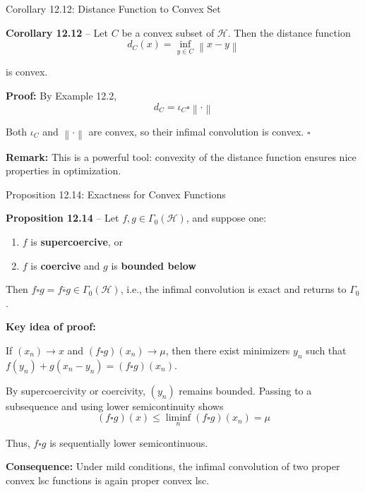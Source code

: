 \documentclass[aspectratio=169,10pt]{beamer}
\newcommand{\cH}{\mathcal{H}}
\newcommand{\norm}[1]{\left\|#1\right\|}
\newcommand{\co}{\square}
\begin{document}
\begin{frame}{Corollary 12.12: Distance Function to Convex Set}

  \textbf{Corollary 12.12} -- Let $C$ be a convex subset of $\cH$. Then
  the distance function
  \[
    d_C(x) = \inf_{y \in C} \norm{x - y}
  \]

  is convex.

  \vspace{1cm}

  \textbf{Proof:} By Example 12.2,
  \[
    d_C = \iota_C \co \norm{\cdot}
  \]

  Both $\iota_C$ and $\norm{\cdot}$ are convex, so their infimal
  convolution is convex. $\square$

  \vspace{1cm}

  \textbf{Remark:} This is a powerful tool: convexity of the distance
  function ensures nice properties in optimization.

\end{frame}

\begin{frame}[allowframebreaks]{Proposition 12.14: Exactness for Convex Functions}

  \textbf{Proposition 12.14} -- Let $f, g \in \Gamma_0(\cH)$, and suppose one:

  \begin{enumerate}
    \item[(i)] $f$ is \textbf{supercoercive}, or
    \item[(ii)] $f$ is \textbf{coercive} and $g$ is \textbf{bounded below}
  \end{enumerate}

  Then $f \co g = f \overline{\co} g \in \Gamma_0(\cH)$, i.e., the infimal
  convolution is exact and returns to $\Gamma_0$.

  \vspace{1cm}

  \textbf{Key idea of proof:}

  If $(x_n) \to x$ and $(f \co g)(x_n) \to \mu$, then there exist
  minimizers $y_n$ such that $f(y_n) + g(x_n - y_n) = (f \co g)(x_n)$.

  By supercoercivity or coercivity, $(y_n)$ remains bounded. Passing
  to a subsequence and using lower semicontinuity shows
  \[
    (f \co g)(x) \le \liminf_{n} (f \co g)(x_n) = \mu
  \]

  Thus, $f \co g$ is sequentially lower semicontinuous.

  \framebreak

  \textbf{Consequence:} Under mild conditions, the infimal convolution of
  two proper convex lsc functions is again proper convex lsc.

\end{frame}
\end{document}
